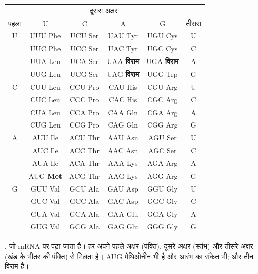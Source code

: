 \begin{omfigure}
\begin{tabular}{c|cccc|c}
\multicolumn{1}{c}{} & \multicolumn{4}{c}{\small दूसरा अक्षर} & \multicolumn{1}{c}{} \\
{\small पहला} & U & C & A & G & {\small तीसरा} \\ \hline
U & UUU Phe & UCU Ser & UAU Tyr & UGU Cys & U \\
 & UUC Phe & UCC Ser & UAC Tyr & UGC Cys & C \\
 & UUA Leu & UCA Ser & UAA \textbf{विराम} & UGA \textbf{विराम} & A \\
 & UUG Leu & UCG Ser & UAG \textbf{विराम} & UGG Trp & G \\ \hline
C & CUU Leu & CCU Pro & CAU His & CGU Arg & U \\
 & CUC Leu & CCC Pro & CAC His & CGC Arg & C \\
 & CUA Leu & CCA Pro & CAA Gln & CGA Arg & A \\
 & CUG Leu & CCG Pro & CAG Gln & CGG Arg & G \\ \hline
A & AUU Ile & ACU Thr & AAU Asn & AGU Ser & U \\
 & AUC Ile & ACC Thr & AAC Asn & AGC Ser & C \\
 & AUA Ile & ACA Thr & AAA Lys & AGA Arg & A \\
 & AUG \textbf{Met} & ACG Thr & AAG Lys & AGG Arg & G \\ \hline
G & GUU Val & GCU Ala & GAU Asp & GGU Gly & U \\
 & GUC Val & GCC Ala & GAC Asp & GGC Gly & C \\
 & GUA Val & GCA Ala & GAA Glu & GGA Gly & A \\
 & GUG Val & GCG Ala & GAG Glu & GGG Gly & G \\
\end{tabular}

{\small {}, जो mRNA पर पढ़ा जाता है। हर  अपने पहले अक्षर
(पंक्ति), दूसरे अक्षर (स्तंभ) और तीसरे अक्षर (खंड के भीतर की पंक्ति) से
मिलता है। AUG मेथिओनीन भी है और आरंभ का संकेत भी; और तीन  विराम हैं।}
\end{omfigure}

